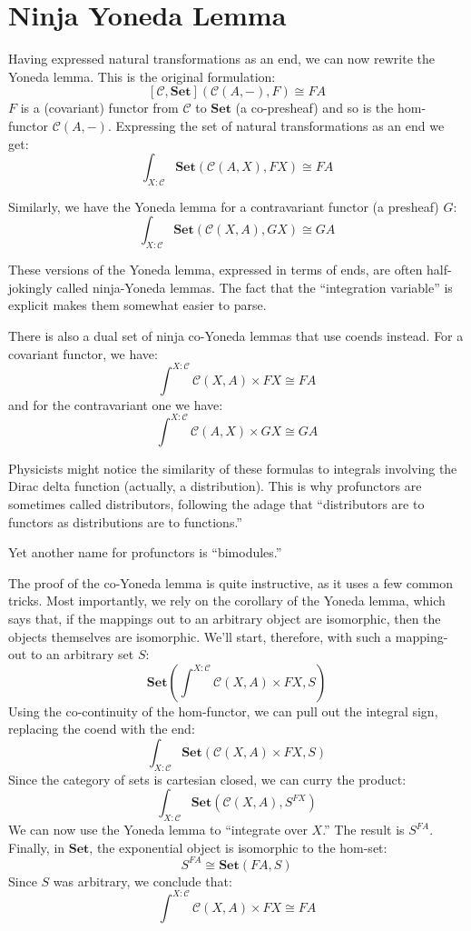 \documentclass[DaoFP]{subfiles}
\begin{document}
\section{Ninja Yoneda Lemma}

Having expressed natural transformations as an end, we can now rewrite the Yoneda lemma. This is the original formulation:
\[ [\mathcal{C}, \mathbf{Set}]( \mathcal{C}(A, -), F) \cong F A \]
$F$ is a (covariant) functor from $\mathcal{C}$ to $\mathbf{Set}$ (a co-presheaf) and so is the hom-functor $\mathcal{C}(A, -)$. 
Expressing the set of natural transformations as an end we get:
\[ \int_{X \colon \mathcal{C}} \mathbf{Set} (\mathcal{C}(A, X), FX) \cong FA \]

Similarly, we have the Yoneda lemma for a contravariant functor (a presheaf) $G$:
\[ \int_{X \colon \mathcal{C}} \mathbf{Set} (\mathcal{C}(X, A), GX) \cong GA \]

These versions of the Yoneda lemma, expressed in terms of ends, are often half-jokingly called ninja-Yoneda lemmas. The fact that the ``integration variable'' is explicit makes them somewhat easier to parse.

There is also a dual set of ninja co-Yoneda lemmas that use coends instead. For a covariant functor, we have:
\[ \int^{X \colon \mathcal{C}} \mathcal{C}(X, A) \times F X \cong F A \]
and for the contravariant one we have:
\[ \int^{X \colon \mathcal{C}} \mathcal{C}(A, X) \times G X \cong G A \]

Physicists might notice the similarity of these formulas to integrals involving the Dirac delta function (actually, a distribution). This is why profunctors are sometimes called distributors, following the adage that ``distributors are to functors as distributions are to functions.'' 

Yet another name for profunctors is ``bimodules.''

The proof of the co-Yoneda lemma is quite instructive, as it uses a few common tricks. Most importantly, we rely on the corollary of the Yoneda lemma, which says that, if the mappings out to an arbitrary object are isomorphic, then the objects themselves are isomorphic. We'll start, therefore, with such a mapping-out to an arbitrary set $S$:
\[ \mathbf{Set} \left(\int^{X \colon \mathcal{C}} \mathcal{C}(X, A) \times F X, S \right) \]
Using the co-continuity of the hom-functor, we can pull out the integral sign, replacing the coend with the end:
\[ \int_{X \colon \mathcal{C}} \mathbf{Set} \left( \mathcal{C}(X, A) \times F X, S \right) \]
Since the category of sets is cartesian closed, we can curry the product:
\[ \int_{X \colon \mathcal{C}} \mathbf{Set} \left( \mathcal{C}(X, A) , S^{FX} \right) \]
We can now use the Yoneda lemma to ``integrate over $X$.'' The result is $S^{FA}$. Finally, in $\mathbf{Set}$, the exponential object is isomorphic to the hom-set:
\[S^{FA} \cong \mathbf{Set}(F A, S)\]
Since $S$ was arbitrary, we conclude that:
\[ \int^{X \colon \mathcal{C}} \mathcal{C}(X, A) \times F X \cong F A \]
\end{document}
